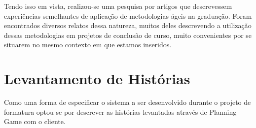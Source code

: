 \documentclass[a4paper,12pt,font=plain,header=plain]{abnt}
\begin{document}
      Tendo isso em vista, realizou-se uma pesquisa por artigos que descrevessem experiências semelhantes de aplicação de metodologias ágeis na graduação. Foram encontrados diversos relatos dessa natureza, muitos deles descrevendo a utilização dessas metodologias em projetos de conclusão de curso, muito convenientes por se situarem no mesmo contexto em que estamos inseridos.

  \section{Levantamento de Histórias}

	Como uma forma de especificar o sistema a ser desenvolvido durante o projeto de formatura optou-se por descrever as histórias levantadas através de Planning Game com o cliente.
\end{document}

